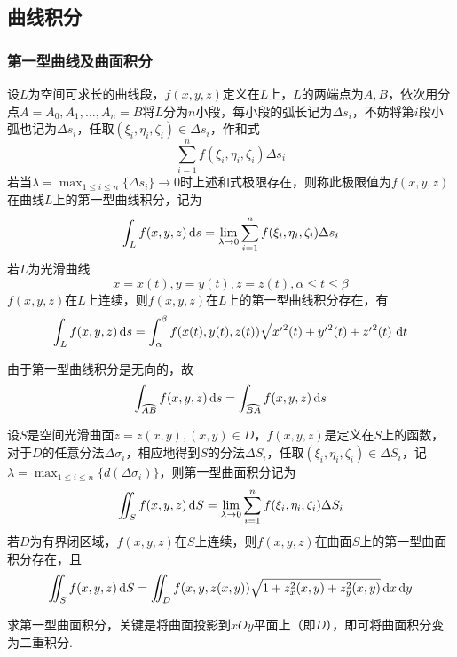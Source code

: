 \subsection{曲线积分}
\subsubsection{第一型曲线及曲面积分}
\begin{definition}[第一型曲线积分]
设$L$为空间可求长的曲线段，$f(x,y,z)$定义在$L$上，$L$的两端点为$A,B$，依次用分点$A=A_0,A_1,\ldots,A_n=B$将$L$分为$n$小段，每小段的弧长记为$\Delta s_i$，不妨将第$i$段小弧也记为$\Delta s_i$，任取$(\xi_i,\eta_i,\zeta_i)\in\Delta s_i$，作和式
\[\sum_{i=1}^n f(\xi_i,\eta_i,\zeta_i)\Delta s_i\]
若当$\lambda=\max_{1\leq i\leq n}\{\Delta s_i\}\to 0$时上述和式极限存在，则称此极限值为$f(x,y,z)$在曲线$L$上的第一型曲线积分，记为
\[\int_Lf(x,y,z)\,\mathrm{d} s=\lim_{\lambda\to 0}\sum_{i=1}^nf(\xi_i,\eta_i,\zeta_i)\Delta s_i\]
若$L$为光滑曲线
\[x=x(t),y=y(t),z=z(t),\alpha\leq t\leq\beta\]
$f(x,y,z)$在$L$上连续，则$f(x,y,z)$在$L$上的第一型曲线积分存在，有
\[\int_Lf(x,y,z)\,\mathrm{d} s=\displaystyle\int_{\alpha}^{\beta}{f(x(t),y(t),z(t))\sqrt{{x'}^2(t)+{y'}^2(t)+{z'}^2(t)}}\,\,\mathrm{d} t\]
\end{definition}
由于第一型曲线积分是无向的，故
\[\int_{\wideparen{AB}}f(x,y,z)\diff s=\int_{\wideparen{BA}}f(x,y,z)\diff s\]
\begin{definition}[第一型曲面积分]
设$S$是空间光滑曲面$z=z(x,y),(x,y)\in D$，$f(x,y,z)$是定义在$S$上的函数，对于$D$的任意分法$\Delta\sigma_i$，相应地得到$S$的分法$\Delta S_i$，任取$(\xi_i,\eta_i,\zeta_i)\in\Delta S_i$，记$\lambda=\max_{1\leq i\leq n}\{d(\Delta\sigma_i)\}$，则第一型曲面积分记为
\[\iint_S f(x,y,z)\,\mathrm{d} S=\lim_{\lambda\to 0}\sum_{i=1}^n f(\xi_i,\eta_i,\zeta_i)\Delta S_i\]
若$D$为有界闭区域，$f(x,y,z)$在$S$上连续，则$f(x,y,z)$在曲面$S$上的第一型曲面积分存在，且
\[\iint_S f(x,y,z)\,\mathrm{d} S=\iint_D f(x,y,z(x,y))\sqrt{1+z_x^2(x,y)+z_y^2(x,y)}\,\mathrm{d} x\,\mathrm{d} y\]
\end{definition}
求第一型曲面积分，关键是将曲面投影到$xOy$平面上（即$D$），即可将曲面积分变为二重积分.

